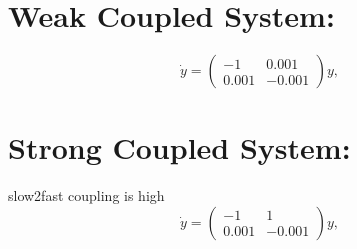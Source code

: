 \documentclass[a4paper,10pt]{article}
\begin{document}
\section{Weak Coupled System:}
\begin{equation}
 \dot{y}= \left( 
        \begin{array}{cc}
           -1 & 0.001 \\
            0.001 & -0.001
        \end{array}
     \right) y,
\end{equation}



\section{Strong Coupled System:}
slow2fast coupling is high
\begin{equation}
 \dot{y}=  \left( 
        \begin{array}{cc}
           -1 & 1 \\
            0.001 & -0.001
        \end{array}
     \right) y,
\end{equation}
\end{document}
